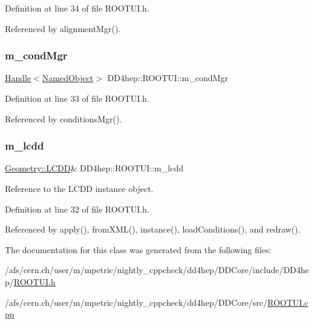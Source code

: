 Definition at line 34 of file R\+O\+O\+T\+U\+I.\+h.



Referenced by alignment\+Mgr().

\hypertarget{class_d_d4hep_1_1_r_o_o_t_u_i_aad76877df2fc04d079cf63b9898c123a}{}\label{class_d_d4hep_1_1_r_o_o_t_u_i_aad76877df2fc04d079cf63b9898c123a} 
\subsubsection{\texorpdfstring{m\+\_\+cond\+Mgr}{m\_condMgr}}
{\footnotesize\ttfamily \hyperlink{class_d_d4hep_1_1_handle}{Handle}$<$\hyperlink{class_d_d4hep_1_1_named_object}{Named\+Object}$>$ D\+D4hep\+::\+R\+O\+O\+T\+U\+I\+::m\+\_\+cond\+Mgr\hspace{0.3cm}{\ttfamily [protected]}}



Definition at line 33 of file R\+O\+O\+T\+U\+I.\+h.



Referenced by conditions\+Mgr().

\hypertarget{class_d_d4hep_1_1_r_o_o_t_u_i_a5ee50c37b731dbace8e02609727c937d}{}\label{class_d_d4hep_1_1_r_o_o_t_u_i_a5ee50c37b731dbace8e02609727c937d} 
\subsubsection{\texorpdfstring{m\+\_\+lcdd}{m\_lcdd}}
{\footnotesize\ttfamily \hyperlink{class_d_d4hep_1_1_geometry_1_1_l_c_d_d}{Geometry\+::\+L\+C\+DD}\& D\+D4hep\+::\+R\+O\+O\+T\+U\+I\+::m\+\_\+lcdd\hspace{0.3cm}{\ttfamily [protected]}}



Reference to the L\+C\+DD instance object. 



Definition at line 32 of file R\+O\+O\+T\+U\+I.\+h.



Referenced by apply(), from\+X\+M\+L(), instance(), load\+Conditions(), and redraw().



The documentation for this class was generated from the following files\+:\begin{DoxyCompactItemize}
\item 
/afs/cern.\+ch/user/m/mpetric/nightly\+\_\+cppcheck/dd4hep/\+D\+D\+Core/include/\+D\+D4hep/\hyperlink{_r_o_o_t_u_i_8h}{R\+O\+O\+T\+U\+I.\+h}\item 
/afs/cern.\+ch/user/m/mpetric/nightly\+\_\+cppcheck/dd4hep/\+D\+D\+Core/src/\hyperlink{_r_o_o_t_u_i_8cpp}{R\+O\+O\+T\+U\+I.\+cpp}\end{DoxyCompactItemize}
